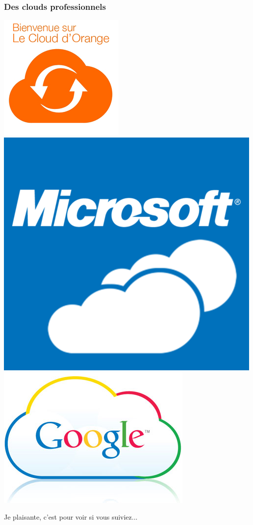\documentclass{beamer}
\begin{document}
\begin{frame}
\frametitle{Des clouds professionnels}
\begin{center}
\includegraphics[scale=0.4] {./images/cloud-orange.png}
\includegraphics[scale=0.4] {./images/cloud-microsoft.png}
\includegraphics[scale=0.35] {./images/Google-Cloud-Computing.jpg}
\end{center}
\end{frame}
\begin{frame}
\begin{center}
\Huge{Je plaisante, c'est pour voir si vous suiviez...}
\end{center}
\end{frame}
\end{document}
